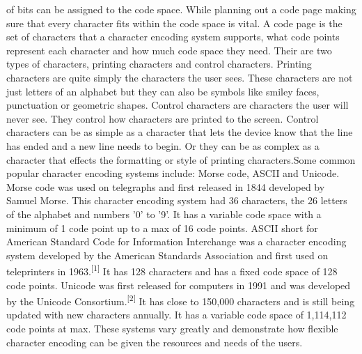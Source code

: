 \documentclass{article}
\begin{document}
\begin{multicols*}{2}
\begin{flushleft}
of bits can be assigned to the code space. While planning out a code page making sure that every character fits within the code space is vital. A code page is the set of characters that a character encoding system supports, what code points represent each character and how much code space they need. Their are two types of characters, printing characters and control characters. Printing characters are quite simply the characters the user sees. These characters are not just letters of an alphabet but they can also be symbols like smiley faces, punctuation or geometric shapes. Control characters are characters the user will never see. They control how characters are printed to the screen. Control characters can be as simple as a character that lets the device know that the line has ended and a new line needs to begin. Or they can be as complex as a character that effects the formatting or style of printing characters.\linebreak\linebreak Some common popular character encoding systems include: Morse code, ASCII and Unicode. Morse code was used on telegraphs and first released in 1844 developed by Samuel Morse. This character encoding system had 36 characters, the 26 letters of the alphabet and numbers '0' to '9'. It has a variable code space with a minimum of 1 code point up to a max of 16 code points. ASCII short for American Standard Code for Information Interchange was a character encoding system developed by the American Standards Association and first used on teleprinters in 1963.\textsuperscript{[1]} It has 128 characters and has a fixed code space of 128 code points. Unicode was first released for computers in 1991 and was developed by the Unicode Consortium.\textsuperscript{[2]} It has close to 150,000 characters and is still being updated with new characters annually. It has a variable code space of 1,114,112 code points at max. These systems vary greatly and demonstrate how flexible character encoding can be given the resources and needs of the users.\end{flushleft}


\end{multicols*}
\end{document}
